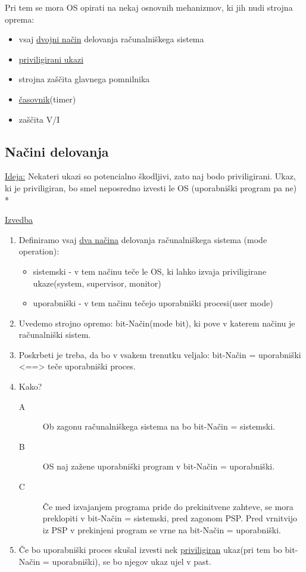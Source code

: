 \documentclass[
  slovene,
  a4paper
]{book}
\begin{document}
Pri tem se mora OS opirati na nekaj osnovnih mehanizmov, ki jih nudi strojna
oprema:
\begin{itemize}
  \item vsaj \underline{dvojni način} delovanja računalniškega sistema
  \item \underline{priviligirani ukazi}
  \item strojna zaščita glavnega pomnilnika
  \item \underline{časovnik}(timer)
  \item zaščita V/I
\end{itemize}

\subsection{Načini delovanja}

\underline{Ideja:} Nekateri ukazi so potencialno škodljivi, zato naj bodo
priviligirani. Ukaz, ki je priviligiran, bo smel neposredno izvesti le OS
(uporabniški program pa ne)\\*

\underline{Izvedba}
\begin{enumerate}
  \item Definiramo vsaj \underline{dva načina} delovanja računalniškega sistema
      (mode operation):
    \begin{itemize}
      \item sistemski - v tem načinu teče le OS, ki lahko izvaja priviligirane
          ukaze(system, supervisor, monitor)
      \item uporabniški - v tem načinu tečejo uporabniški procesi(user mode)
    \end{itemize}
  \item Uvedemo strojno opremo: bit-Način(mode bit), ki pove v katerem načinu je
      računalniški sistem.
  \item Poskrbeti je treba, da bo v vsakem trenutku veljalo: bit-Način = 
      uporabniški <==> teče uporabniški proces.
  \item Kako?
    \begin{description}
      \item[A] Ob zagonu računalniškega sistema na bo bit-Način = sistemski. 
      \item[B] OS naj zažene uporabniški program v bit-Način = uporabniški.
      \item[C] Če med izvajanjem programa pride do prekinitvene zahteve, se mora
           preklopiti v bit-Način = sistemski, pred zagonom PSP. Pred vrnitvijo
           iz PSP v prekinjeni program se vrne na bit-Način = uporabniški.
    \end{description}
  \item Če bo uporabniški proces skušal izvesti nek \underline{priviligiran}
      ukaz(pri tem bo bit-Način = uporabniški), se bo njegov ukaz ujel v past.
\end{enumerate}
\end{document}
